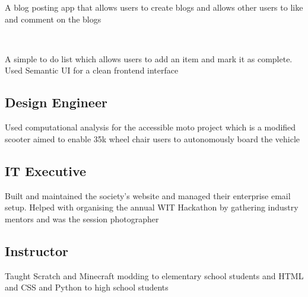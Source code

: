 \documentclass[11pt, a4paper]{MagicalCV}
\begin{document}
\begin{minipage}[t]{1\textwidth}
A blog posting app that allows users to create blogs and allows other users to like and comment on the blogs
\sectionsep

\\
 
A simple to do list which allows users to add an item and mark it as complete. Used Semantic UI for a clean frontend interface
\sectionsep 

\sectionsep
\subsection{Design Engineer}

\vspace{\topsep} %
Used computational analysis for the accessible moto project which is a modified scooter aimed to enable 35k wheel chair users to autonomously board the vehicle
\sectionsep

\subsection{IT Executive}
\vspace{\topsep} %
Built and maintained the society's website and managed their enterprise email setup. Helped with organising the annual WIT Hackathon by gathering industry mentors and was the session photographer
\sectionsep

\subsection{Instructor}
\vspace{\topsep} %
Taught Scratch and Minecraft modding to elementary school students and HTML and CSS and Python to high school students
\sectionsep

\end{minipage}
\end{document}
